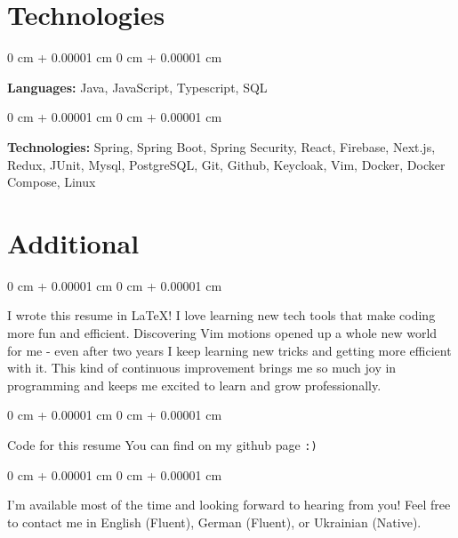 \documentclass[10pt, letterpaper]{article}
\newenvironment{onecolentry}{
    \begin{adjustwidth}{
        0 cm + 0.00001 cm
    }{
        0 cm + 0.00001 cm
    }
}{
    \end{adjustwidth}
} %
\begin{document}
    \section{Technologies}
        \begin{onecolentry}
            \textbf{Languages:} Java, JavaScript, Typescript, SQL
        \end{onecolentry}

        \vspace{0.2 cm}

        \begin{onecolentry}
            \textbf{Technologies:} Spring, Spring Boot, Spring Security, React, Firebase, Next.js, Redux, JUnit, Mysql, PostgreSQL, Git, Github, Keycloak, Vim, Docker, Docker Compose, Linux
        \end{onecolentry}


    \section{Additional}

    \begin{onecolentry}
        I wrote this resume in \LaTeX{}! I love learning new tech tools that make coding more fun and efficient. Discovering Vim motions opened up a whole new world for me - even after two years I keep learning new tricks and getting more efficient with it. This kind of continuous improvement brings me so much joy in programming and keeps me excited to learn and grow professionally.
    \end{onecolentry}

    \vspace{0.1 cm}
    \begin{onecolentry}
        Code for this resume You can find on my github page \texttt{:)}
    \end{onecolentry}

    \vspace{0.1 cm}
    \begin{onecolentry}
    I'm available most of the time and looking forward to hearing from you! Feel free to contact me in English (Fluent), German (Fluent), or Ukrainian (Native).
    \end{onecolentry}
\end{document}
